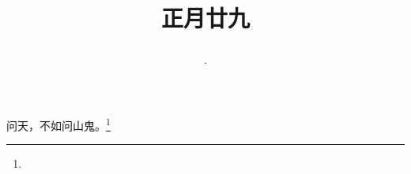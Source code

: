 \title{\date[d=9,m=3,y=2024][year:cn-y,年,month:cn,day:cn,日,·,weekday]·正月廿九 }
问天，不如问山鬼。\footnote{ }

